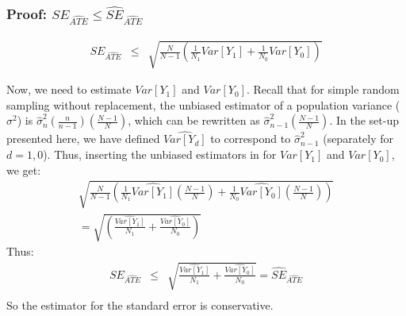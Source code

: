\documentclass{beamer}
\numberwithin{equation}{section}
\begin{document}
\begin{frame}
  \frametitle{Proof: $SE_{\widehat{ATE}}\leq \widehat{SE}_{\widehat{ATE}}$}
\scriptsize

\begin{eqnarray*}
  SE_{\widehat{ATE}} & \leq & \sqrt{\frac{N}{N-1} \left(\frac{1}{N_1}Var[Y_1] + \frac{1}{N_0}Var[Y_0] \right)} 
\end{eqnarray*}

Now, we need to estimate $Var[Y_1]$ and $Var[Y_0]$. Recall that for simple random sampling without replacement, the unbiased estimator of a population variance ($\sigma^2$) is $\hat{\sigma}^2_n (\frac{n}{n-1})(\frac{N-1}{N})$, which can be rewritten as $\hat{\sigma}^2_{n-1}(\frac{N-1}{N})$. In the set-up presented here, we have defined $\widehat{Var[Y_d]}$ to correspond to $\hat{\sigma}^2_{n-1}$ (separately for $d=1,0$). Thus, inserting the unbiased estimators in for $Var[Y_1]$ and $Var[Y_0]$, we get:
\begin{eqnarray*}
\sqrt{\frac{N}{N-1} \left(\frac{1}{N_1}\widehat{Var[Y_1]} \left(\frac{N-1}{N} \right) + \frac{1}{N_0}\widehat{Var[Y_0]} \left(\frac{N-1}{N} \right) \right)} \\
= \sqrt{\left(\frac{\widehat{Var[Y_1]}}{N_1}+ \frac{ \widehat{Var[Y_0]}}{N_0} \right)}
\end{eqnarray*} 
Thus:
\begin{eqnarray*}
SE_{\widehat{ATE}} & \leq  & \sqrt{\frac{\widehat{Var[Y_1]}}{N_1}+ \frac{ \widehat{Var[Y_0]}}{N_0} } =  \widehat{SE}_{\widehat{ATE}}\\
\end{eqnarray*}
So the estimator for the standard error is conservative.

\end{frame}
\end{document}
